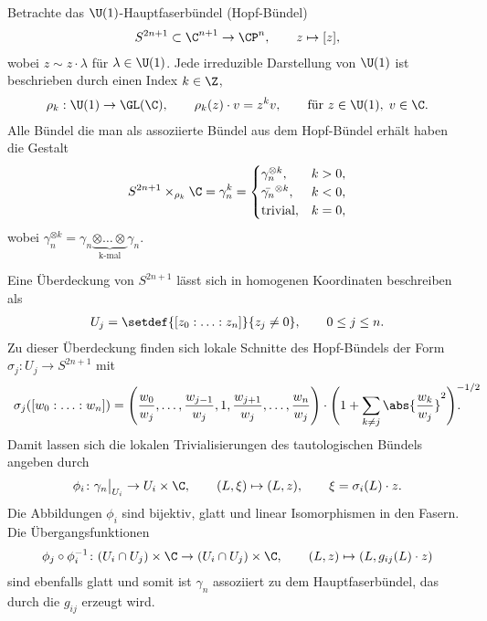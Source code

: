 \documentclass[%
	paper=a5,%
	fleqn,%
	DIV=18,%
	BCOR=0mm,
	fontsize=11pt,
	titlepage=false,%
	bibliography=totoc,
	DIV=18,%
	twoside=true,
	pdftitle=Riemannsche Geometrie,
	pdfauthor=Uwe Semmelmann,
	numbers=noendperiod]%
	{scrbook}
\begin{document}
\begin{ex}
\begin{exenum}
Betrachte das $\U(1)$-Hauptfaserbündel (Hopf-Bündel)
\begin{align*}
S^{2n+1}\subset \C^{n+1} \to \CP^n,\qquad z\mapsto [z],
\end{align*}
wobei $z \sim z\cdot \lambda$ für $\lambda\in \U(1)$. Jede irreduzible
Darstellung von $\U(1)$ ist beschrieben durch einen Index $k\in\Z$,
\begin{align*}
\rho_k : \U(1)\to \GL(\C),\qquad \rho_k(z)\cdot v = z^kv,\qquad
\text{für }z\in\U(1),\; v\in \C.
\end{align*}
Alle Bündel die man als assoziierte Bündel aus dem Hopf-Bündel erhält haben die
Gestalt
\begin{align*}
S^{2n+1}\times_{\rho_k}\C = \gamma_n^k =
\begin{cases}
\gamma_n^{\otimes k}, & k > 0,\\
\bar{\gamma_n}^{\otimes k}, & k < 0,\\
\text{trivial}, & k=0,
\end{cases}
\end{align*}
wobei $\gamma_n^{\otimes k} = \gamma_n \underbrace{\otimes \ldots
\otimes}_{\text{k-mal}} \gamma_n$.

Eine Überdeckung von $S^{2n+1}$ lässt sich in homogenen Koordinaten beschreiben
als
\begin{align*}
U_j = \setdef{[z_0:\ldots:z_n]}{z_j\neq 0},\qquad 0\le j \le n.
\end{align*}
Zu dieser Überdeckung finden sich lokale Schnitte des Hopf-Bündels der
Form $\sigma_j : U_j \to S^{2n+1}$ mit
\begin{align*}
\sigma_j([w_0:\ldots:w_n]) =
\Biggl(\frac{w_0}{w_j},\ldots,
\frac{w_{j-1}}{w_j},1,\frac{w_{j+1}}{w_j},\ldots,\frac{w_n}{w_j}
\Biggr)\cdot\Biggl(1 + \sum_{k\neq j}
\abs{\frac{w_k}{w_j}}^2\Biggr)^{-1/2}\!\!\!\!\!\!\!\!\!\!\!.
\end{align*}
Damit lassen sich die lokalen Trivialisierungen des tautologischen Bündels
angeben durch
\begin{align*}
\phi_i\colon \gamma_n\big|_{U_i} \to U_i\times \C,\qquad (L,\xi) \mapsto (L,z),\qquad
\xi = \sigma_i(L)\cdot z.
\end{align*}
Die Abbildungen $\phi_i$ sind bijektiv, glatt und linear Isomorphismen in den
Fasern. Die Übergangsfunktionen
\begin{align*}
\phi_j\circ\phi_i^{-1}\colon (U_i\cap U_j)\times\C\to (U_i\cap U_j)\times\C,\qquad
(L,z) \mapsto (L,g_{ij}(L)\cdot z)
\end{align*}
sind ebenfalls glatt und somit ist $\gamma_n$ assoziiert zu dem
Hauptfaserbündel, das durch die $g_{ij}$ erzeugt wird.\boxc
\end{exenum}

\end{ex}
\end{document}
